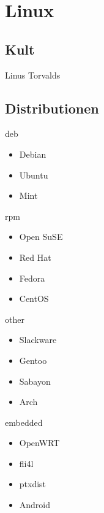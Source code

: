 \documentclass{beamer}
\begin{document}
\section{Linux}

\subsection{Kult}

\begin{frame}{Linus Torvalds}
\end{frame}

\subsection{Distributionen}

\begin{frame}{deb}
    \begin{itemize}
        \item Debian
        \item Ubuntu
        \item Mint
    \end{itemize}
\end{frame}

\begin{frame}{rpm}
    \begin{itemize}
        \item Open SuSE
        \item Red Hat
        \item Fedora
        \item CentOS
    \end{itemize}
\end{frame}

\begin{frame}{other}
    \begin{itemize}
        \item Slackware
        \item Gentoo
        \item Sabayon
        \item Arch
    \end{itemize}
\end{frame}

\begin{frame}{embedded}
    \begin{itemize}
        \item OpenWRT
        \item fli4l
        \item ptxdist
        \item Android
    \end{itemize}
\end{frame}
\end{document}

